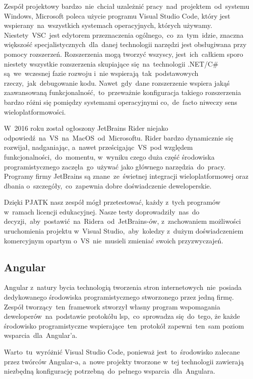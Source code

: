 Zespół projektowy bardzo~nie~chciał uzależnić pracy~nad~projektem~od~systemu Windows, Microsoft poleca użycie programu Visual Studio Code, który jest wspierany~na~wszystkich systemach operacyjnych, których używamy.
Niestety~VSC~jest edytorem przeznaczenia ogólnego,~co~za~tym~idzie, znaczna większość specjalistycznych~dla~danej technologii narzędzi jest obsługiwana przy pomocy rozszerzeń.
Rozszerzenia mogą tworzyć wszyscy, jest~ich~całkiem sporo niestety wszystkie rozszerzenia skupiające się~na~technologii .NET/C\# są~we~wczesnej fazie rozwoju i~nie wspierają~tak~podstawowych rzeczy,~jak~debugowanie kodu.
Nawet~gdy~dane rozszerzenie wspiera jakąś zaawansowaną funkcjonalność,~to~przeważnie konfiguracja takiego rozszerzenia bardzo różni się pomiędzy systemami operacyjnymi co,~de~facto niweczy sens wieloplatformowości.

W~2016 roku został ogłoszony JetBrains Rider niejako odpowiedź~na~VS~na~MacOS~od~Microsoftu.
Rider bardzo dynamicznie się rozwijał, nadganiając, a~nawet prześcigając~VS~pod względem funkcjonalności,~do~momentu, w~wyniku czego duża część środowiska programistycznego zaczęła~go~używać jako głównego narzędzia~do~pracy.
Programy firmy JetBrains są znane~ze~świetnej integracji wieloplatformowej oraz dbania o~szczegóły,~co~zapewnia dobre doświadczenie deweloperskie.

Dzięki PJATK nasz zespół mógł przetestować, każdy z~tych programów w~ramach licencji edukacyjnej.
Nasze testy doprowadziły~nas~do decyzji,~aby~postawić~na~Ridera~od~JetBrains-ów, z~zachowaniem możliwości uruchomienia projektu w~Visual Studio,~aby~koledzy z~dużym doświadczeniem komercyjnym opartym o~VS~nie~musieli zmieniać swoich przyzwyczajeń.

\subsection{Angular}\label{subsec:angular}
Angular z~natury bycia technologią tworzenia stron internetowych~nie~posiada dedykowanego środowiska programistycznego stworzonego przez jedną firmę.
Zespół tworzący~ten~framework stworzył własny program wspomagania deweloperów~na~podstawie protokółu \acrshort{lsp},~co~sprowadza się~do~tego, że każde środowisko programistyczne wspierające~ten~protokół zapewni~ten~sam poziom wsparcia~dla~Angular'a.

Warto~tu~wyróżnić Visual Studio Code, ponieważ jest~to~środowisko zalecane przez twórców Angular-a, a~nowe projekty tworzone w~tej technologii zawierają niezbędną konfigurację potrzebną~do~pełnego wsparcia~dla~Angulara.

